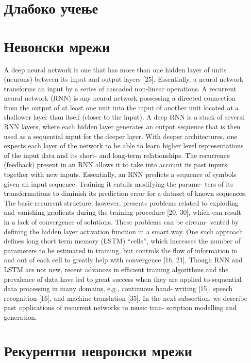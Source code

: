 \section{Длабоко учење}

\section{Невонски мрежи}

\cite{Sturm2016} A deep neural network is one that has more than one hidden layer of units (neurons) between its input and output layers [25]. Essentially, a neural network transforms an input by a series of cascaded non-linear operations. A recurrent neural network (RNN) is any neural network possessing a directed connection from the output of at least one unit into the input of another unit located at a shallower layer than itself (closer to the input). A deep RNN is a stack of several RNN layers, where each hidden layer generates an output sequence that is then used as a sequential input for the deeper layer. With deeper architectures, one expects each layer of the network to be able to learn higher level representations of the input data and its short- and long-term relationships.
The recurrence (feedback) present in an RNN allows it to take into account
its past inputs together with new inputs. Essentially, an RNN predicts a sequence of symbols given an input sequence. Training it entails modifying the parame- ters of its transformations to diminish its prediction error for a dataset of known sequences. The basic recurrent structure, however, presents problems related to exploding and vanishing gradients during the training procedure [20, 30], which can result in a lack of convergence of solutions. These problems can be circum- vented by defining the hidden layer activation function in a smart way. One such approach defines long short term memory (LSTM) “cells”, which increases the number of parameters to be estimated in training, but controls the flow of information in and out of each cell to greatly help with convergence [16, 21]. Though RNN and LSTM are not new, recent advances in efficient training
algorithms and the prevalence of data have led to great success when they are applied to sequential data processing in many domains, e.g., continuous hand- writing [15], speech recognition [16], and machine translation [35]. In the next subsection, we describe past applications of recurrent networks to music tran- scription modelling and generation.
  
\section{Рекурентни невронски мрежи}

